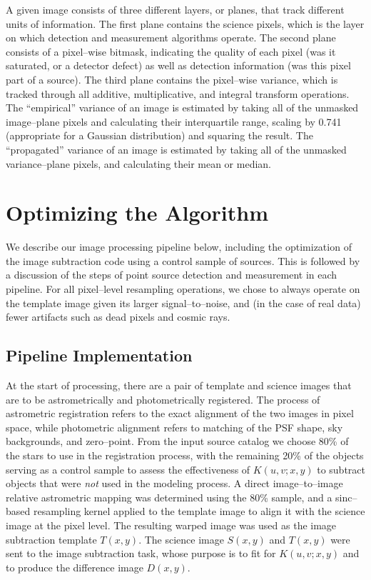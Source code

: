 \documentclass[iop]{emulateapj}
\begin{document}
A given image consists of three different layers, or planes, that track different units of information.
The first plane contains the science pixels, which is the layer on which detection and measurement algorithms operate.
The second plane consists of a pixel--wise bitmask, indicating the quality of each pixel (was it saturated, or a detector defect) as well as detection information (was this pixel part of a source).
The third plane contains the pixel--wise variance, which is tracked through all additive, multiplicative, and integral transform operations.
The ``empirical'' variance of an image is estimated by taking all of the unmasked image--plane pixels and calculating their interquartile range, scaling by 0.741 (appropriate for a Gaussian distribution) and squaring the result.
The ``propagated'' variance of an image is estimated by taking all of the unmasked variance--plane pixels, and calculating their mean or median.

\section{Optimizing the Algorithm}

We describe our image processing pipeline below, including the optimization of the image subtraction code using a control sample of sources.
This is followed by a discussion of the steps of point source detection and measurement in each pipeline.
For all pixel--level resampling operations, we chose to always operate on the template image given its larger signal--to--noise, and (in the case of real data) fewer artifacts such as dead pixels and cosmic rays.

\subsection{Pipeline Implementation}

At the start of processing, there are a pair of template and science images that are to be astrometrically and photometrically registered.
The process of astrometric registration refers to the exact alignment of the two images in pixel space, while photometric alignment refers to matching of the PSF shape, sky backgrounds, and zero--point.
From the input source catalog we choose 80\% of the stars to use in the registration process, with the remaining 20\% of the objects serving as a control sample to assess the effectiveness of $K(u,v;x,y)$ to subtract objects that were {\it not} used in the modeling process.
A direct image--to--image relative astrometric mapping was determined using the 80\% sample, and a sinc--based resampling kernel applied to the template image to align it with the science image at the pixel level.
The resulting warped image was used as the image subtraction template $T(x,y)$.
The science image $S(x,y)$ and $T(x,y)$ were sent to the image subtraction task, whose purpose is to fit for $K(u,v;x,y)$ and to produce the difference image $D(x,y)$.
\end{document}
